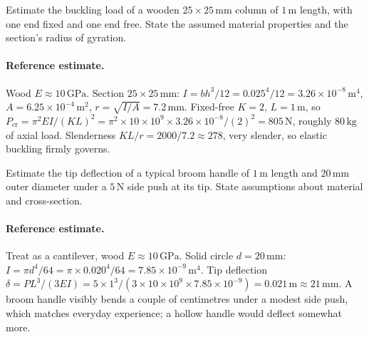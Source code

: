 \begin{exercise}
Estimate the buckling load of a wooden $25 \times 25\,\si{\milli\meter}$
column of $1\,\si{\meter}$ length, with one end fixed and one end
free. State the assumed material properties and the section's
radius of gyration.

\paragraph{Reference estimate.} Wood $E \approx 10\,\text{GPa}$.
Section $25\times 25\,\si{\milli\meter}$: $I = bh^3/12 = 0.025^4/12 =
3.26\times 10^{-8}\,\si{\meter\tothe{4}}$, $A = 6.25\times 10^{-4}\,
\si{\meter\squared}$, $r = \sqrt{I/A} = 7.2\,\si{\milli\meter}$.
Fixed-free $K = 2$, $L = 1\,\si{\meter}$, so $P_{\text{cr}} = \pi^2EI/
(KL)^2 = \pi^2\times 10\times 10^9 \times 3.26\times 10^{-8}/(2)^2 =
805\,\text{N}$, roughly $80\,\si{\kilogram}$ of axial load. Slenderness
$KL/r = 2000/7.2 \approx 278$, very slender, so elastic buckling
firmly governs.
\end{exercise}

\begin{exercise}
Estimate the tip deflection of a typical broom handle of $1\,\si{
\meter}$ length and $20\,\si{\milli\meter}$ outer diameter under a
$5\,\si{\newton}$ side push at its tip. State assumptions about
material and cross-section.

\paragraph{Reference estimate.} Treat as a cantilever, wood $E \approx
10\,\text{GPa}$. Solid circle $d = 20\,\si{\milli\meter}$: $I = \pi
d^4/64 = \pi\times 0.020^4/64 = 7.85\times 10^{-9}\,\si{\meter\tothe{4}}$.
Tip deflection $\delta = PL^3/(3EI) = 5\times 1^3/(3\times 10\times
10^9 \times 7.85\times 10^{-9}) = 0.021\,\si{\meter} \approx 21\,\si{
\milli\meter}$. A broom handle visibly bends a couple of centimetres
under a modest side push, which matches everyday experience; a hollow
handle would deflect somewhat more.
\end{exercise}

